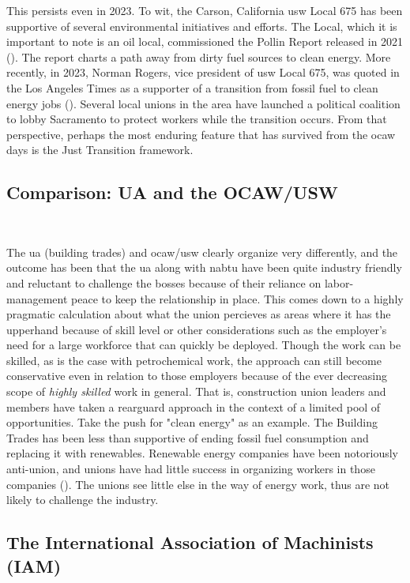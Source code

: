 \documentclass[12pt]{article}
\begin{document}
This persists even in 2023. To wit, the Carson, California \acrshort{usw} Local 675 has been supportive of several environmental initiatives and efforts. The Local, which it is important to note is an oil local, commissioned the Pollin Report released in 2021 (\cite{pollinProgramEconomicRecovery2021}). The report charts a path away from dirty fuel sources to clean energy. More recently, in 2023, Norman Rogers, vice president of \acrshort{usw} Local 675, was quoted in the Los Angeles Times as a supporter of a transition from fossil fuel to clean energy jobs (\cite{rothCanClimateActivists2023}). Several local unions in the area have launched a political coalition to lobby Sacramento to protect workers while the transition occurs. From that perspective, perhaps the most enduring feature that has survived from the \acrshort{ocaw} days is the Just Transition framework.

\subsection{Comparison: UA and the OCAW/USW}\

The \acrfull{ua} (building trades) and \acrshort{ocaw}/\acrshort{usw} clearly organize very differently, and the outcome has been that the \acrshort{ua} along with \acrfull{nabtu} have been quite industry friendly and reluctant to challenge the bosses because of their reliance on labor-management peace to keep the relationship in place. This comes down to a highly pragmatic calculation about what the union percieves as areas where it has the upperhand because of skill level or other considerations such as the employer's need for a large workforce that can quickly be deployed. Though the work can be skilled, as is the case with petrochemical work, the approach can still become conservative even in relation to those employers because of the ever decreasing scope of \emph{highly skilled} work in general. That is, construction union leaders and members have taken a rearguard approach in the context of a limited pool of opportunities. Take the push for "clean energy" as an example. The Building Trades has been less than supportive of ending fossil fuel consumption and replacing it with renewables. Renewable energy companies have been notoriously anti-union, and unions have had little success in organizing workers in those companies (\cite{scheiberBuildingSolarFarms2021}). The unions see little else in the way of energy work, thus are not likely to challenge the industry.


\subsection{The International Association of Machinists (IAM)} \
\end{document}
